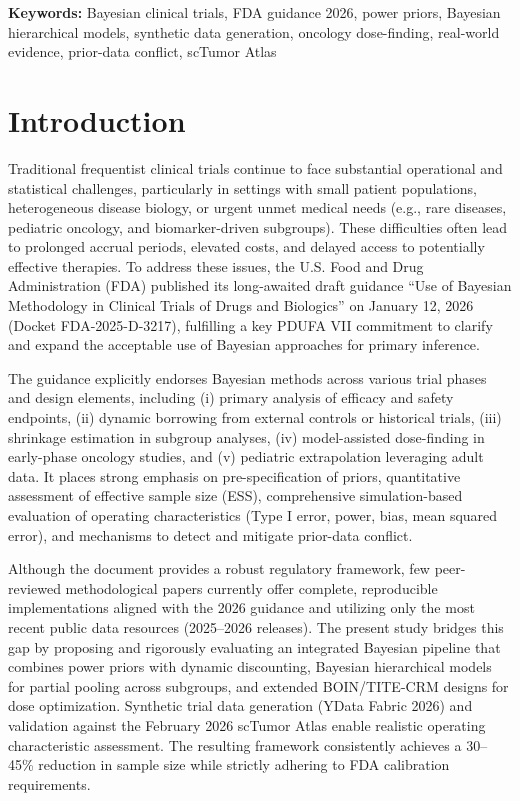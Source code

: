 \documentclass[11pt,a4paper,twoside]{article}
\begin{document}
\textbf{Keywords:} Bayesian clinical trials, FDA guidance 2026, power priors, Bayesian hierarchical models, synthetic data generation, oncology dose-finding, real-world evidence, prior-data conflict, scTumor Atlas

\section{Introduction}
Traditional frequentist clinical trials continue to face substantial operational and statistical challenges, particularly in settings with small patient populations, heterogeneous disease biology, or urgent unmet medical needs (e.g., rare diseases, pediatric oncology, and biomarker-driven subgroups). These difficulties often lead to prolonged accrual periods, elevated costs, and delayed access to potentially effective therapies. To address these issues, the U.S. Food and Drug Administration (FDA) published its long-awaited draft guidance ``Use of Bayesian Methodology in Clinical Trials of Drugs and Biologics'' on January 12, 2026 (Docket FDA-2025-D-3217), fulfilling a key PDUFA VII commitment to clarify and expand the acceptable use of Bayesian approaches for primary inference.

The guidance explicitly endorses Bayesian methods across various trial phases and design elements, including (i) primary analysis of efficacy and safety endpoints, (ii) dynamic borrowing from external controls or historical trials, (iii) shrinkage estimation in subgroup analyses, (iv) model-assisted dose-finding in early-phase oncology studies, and (v) pediatric extrapolation leveraging adult data. It places strong emphasis on pre-specification of priors, quantitative assessment of effective sample size (ESS), comprehensive simulation-based evaluation of operating characteristics (Type I error, power, bias, mean squared error), and mechanisms to detect and mitigate prior-data conflict.

Although the document provides a robust regulatory framework, few peer-reviewed methodological papers currently offer complete, reproducible implementations aligned with the 2026 guidance and utilizing only the most recent public data resources (2025–2026 releases). The present study bridges this gap by proposing and rigorously evaluating an integrated Bayesian pipeline that combines power priors with dynamic discounting, Bayesian hierarchical models for partial pooling across subgroups, and extended BOIN/TITE-CRM designs for dose optimization. Synthetic trial data generation (YData Fabric 2026) and validation against the February 2026 scTumor Atlas enable realistic operating characteristic assessment. The resulting framework consistently achieves a 30–45\% reduction in sample size while strictly adhering to FDA calibration requirements.
\end{document}
